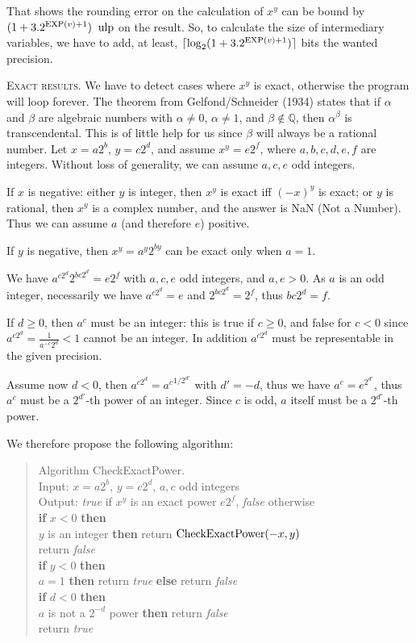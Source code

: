 \documentclass[12pt]{amsart}
\def\q{\hspace*{5mm}}
\def\ulp{{\rm ulp}}
\def\Exp{{\rm EXP}}
\def\Q{{\mathbb Q}}
\begin{document}
That shows the rounding error on the calculation of $x^y$
can be bound by $ (1+3.2^{\Exp(v)+1})\;\; \ulp$ on the result. So,
to calculate the size of intermediary variables, we have to add, at
least, $\lceil \log_2 (1+3.2^{\Exp(v)+1}) \rceil$ bits the wanted
precision.

\medskip

\noindent
\textsc{Exact results.}
We have to detect cases where $x^y$ is exact, otherwise the program will
loop forever.
The theorem from Gelfond/Schneider (1934) states that if $\alpha$ and
$\beta$ are algebraic numbers with $\alpha \neq 0$, $\alpha \neq 1$,
and $\beta \notin \Q$, then $\alpha^{\beta}$ is transcendental.
This is of little help for us since $\beta$ will always be a rational
number.
Let $x = a 2^b$, $y = c 2^d$, and assume $x^y = e 2^f$, where 
$a, b, c, d, e, f$ are integers.
Without loss of generality, we can assume $a, c, e$ odd integers.

If $x$ is negative: either $y$ is integer, then $x^y$ is exact iff
$(-x)^y$ is exact; or $y$ is rational, then $x^y$ is a complex number,
and the answer is NaN (Not a Number).
Thus we can assume $a$ (and therefore $e$) positive.

If $y$ is negative, then $x^y = a^y 2^{b y}$ can be exact only when
$a=1$.

We have $a^{c 2^d} 2^{b c 2^d} = e 2^f$ with $a, c, e$ odd integers,
and $a, e > 0$.
As $a$ is an odd integer, necessarily we have $a^{c 2^d} = e$
and $2^{b c 2^d} = 2^f$, thus $b c 2^d = f$.

If $d \geq 0$, then $a^c$ must be an integer: this is true if $c \geq 0$,
and false for $c < 0$ since $a^{c 2^d} = \frac{1}{a^{-c} 2^d} < 1$ cannot be an
integer. In addition $a^{c 2^d}$ must be representable in the given precision.

Assume now $d < 0$, 
then $a^{c 2^d} = {a^c}^{1/2^{d'}}$ with $d'=-d$, thus
we have $a^c = e^{2^{d'}}$, thus $a^c$ must be a $2^{d'}$-th power
of an integer.
Since $c$ is odd, $a$ itself must be a $2^{d'}$-th power.

We therefore propose the following algorithm:
\begin{quote}
Algorithm CheckExactPower. \\
Input: $x=a 2^b$, $y=c 2^d$, $a, c$ odd integers \\
Output: \emph{true} if $x^y$ is an exact power $e 2^f$, {\em false} otherwise\\
{\bf if} $x < 0$ {\bf then} \\
\q {\bf if} $y$ is an integer {\bf then} return ${\rm CheckExactPower}(-x,y)$\\
\q {\bf else} return {\em false} \\
{\bf if} $y < 0$ {\bf then} \\
\q {\bf if} $a=1$ {\bf then} return {\em true} {\bf else} return {\em false}\\
{\bf if} $d < 0$ {\bf then} \\
\q {\bf if} $a$ is not a $2^{-d}$ power {\bf then} return {\em false} \\
return {\em true}
\end{quote}
\end{document}
